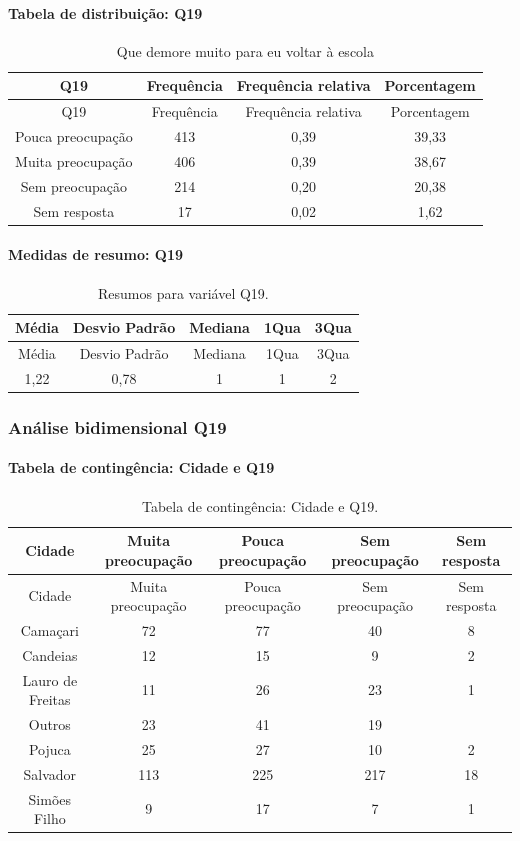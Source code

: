 \documentclass[]{article}
\let\oldparagraph\paragraph
\renewcommand{\paragraph}[1]{\oldparagraph{#1}\mbox{}}
\begin{document}
\hypertarget{tabela-de-distribuiuxe7uxe3o-q19}{%
\paragraph{Tabela de distribuição: Q19}\label{tabela-de-distribuiuxe7uxe3o-q19}}

\begin{longtable}[]{@{}cccc@{}}
\caption{\label{tab:unnamed-chunk-306}Que demore muito para eu voltar à escola}\tabularnewline
\toprule
Q19 & Frequência & Frequência relativa & Porcentagem\tabularnewline
\midrule
\endfirsthead
\toprule
Q19 & Frequência & Frequência relativa & Porcentagem\tabularnewline
\midrule
\endhead
Pouca preocupação & 413 & 0,39 & 39,33\tabularnewline
Muita preocupação & 406 & 0,39 & 38,67\tabularnewline
Sem preocupação & 214 & 0,20 & 20,38\tabularnewline
Sem resposta & 17 & 0,02 & 1,62\tabularnewline
\bottomrule
\end{longtable}

\hypertarget{medidas-de-resumo-q19}{%
\paragraph{Medidas de resumo: Q19}\label{medidas-de-resumo-q19}}

\begin{longtable}[]{@{}ccccc@{}}
\caption{\label{tab:unnamed-chunk-307}Resumos para variável Q19.}\tabularnewline
\toprule
Média & Desvio Padrão & Mediana & 1Qua & 3Qua\tabularnewline
\midrule
\endfirsthead
\toprule
Média & Desvio Padrão & Mediana & 1Qua & 3Qua\tabularnewline
\midrule
\endhead
1,22 & 0,78 & 1 & 1 & 2\tabularnewline
\bottomrule
\end{longtable}

\cleardoublepage

\hypertarget{anuxe1lise-bidimensional-q19}{%
\subsubsection{Análise bidimensional Q19}\label{anuxe1lise-bidimensional-q19}}

\hypertarget{tabela-de-continguxeancia-cidade-e-q19}{%
\paragraph{Tabela de contingência: Cidade e Q19}\label{tabela-de-continguxeancia-cidade-e-q19}}

\begin{longtable}[]{@{}ccccc@{}}
\caption{\label{tab:unnamed-chunk-308}Tabela de contingência: Cidade e Q19.}\tabularnewline
\toprule
Cidade & Muita preocupação & Pouca preocupação & Sem preocupação & Sem resposta\tabularnewline
\midrule
\endfirsthead
\toprule
Cidade & Muita preocupação & Pouca preocupação & Sem preocupação & Sem resposta\tabularnewline
\midrule
\endhead
Camaçari & 72 & 77 & 40 & 8\tabularnewline
Candeias & 12 & 15 & 9 & 2\tabularnewline
Lauro de Freitas & 11 & 26 & 23 & 1\tabularnewline
Outros & 23 & 41 & 19 &\tabularnewline
Pojuca & 25 & 27 & 10 & 2\tabularnewline
Salvador & 113 & 225 & 217 & 18\tabularnewline
Simões Filho & 9 & 17 & 7 & 1\tabularnewline
\bottomrule
\end{longtable}
\end{document}
